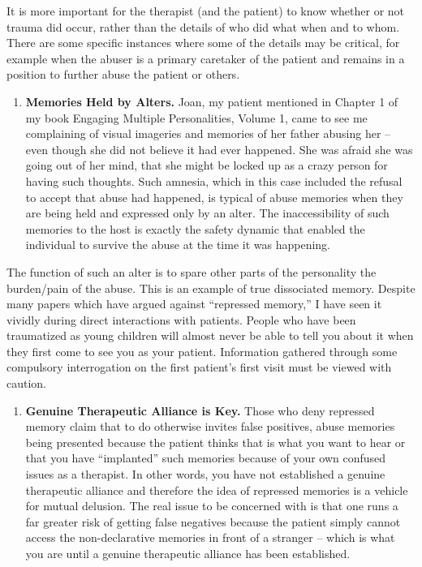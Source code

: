 \documentclass[]{book}
\providecommand{\tightlist}{%
  \setlength{\itemsep}{0pt}\setlength{\parskip}{0pt}}
\begin{document}
It is more important for the therapist (and the patient) to know whether or not trauma did occur, rather than the details of who did what when and to whom. There are some specific instances where some of the details may be critical, for example when the abuser is a primary caretaker of the patient and remains in a position to further abuse the patient or others.

\begin{enumerate}
\def\labelenumi{\arabic{enumi}.}
\setcounter{enumi}{6}
\tightlist
\item
  \textbf{Memories Held by Alters.} Joan, my patient mentioned in Chapter 1 of my book Engaging Multiple Personalities, Volume 1, came to see me complaining of visual imageries and memories of her father abusing her -- even though she did not believe it had ever happened. She was afraid she was going out of her mind, that she might be locked up as a crazy person for having such thoughts. Such amnesia, which in this case included the refusal to accept that abuse had happened, is typical of abuse memories when they are being held and expressed only by an alter. The inaccessibility of such memories to the host is exactly the safety dynamic that enabled the individual to survive the abuse at the time it was happening.
\end{enumerate}

The function of such an alter is to spare other parts of the personality the burden/pain of the abuse. This is an example of true dissociated memory. Despite many papers which have argued against ``repressed memory,'' I have seen it vividly during direct interactions with patients. People who have been traumatized as young children will almost never be able to tell you about it when they first come to see you as your patient. Information gathered through some compulsory interrogation on the first patient's first visit must be viewed with caution.

\begin{enumerate}
\def\labelenumi{\arabic{enumi}.}
\setcounter{enumi}{7}
\tightlist
\item
  \textbf{Genuine Therapeutic Alliance is Key.} Those who deny repressed memory claim that to do otherwise invites false positives, abuse memories being presented because the patient thinks that is what you want to hear or that you have ``implanted'' such memories because of your own confused issues as a therapist. In other words, you have not established a genuine therapeutic alliance and therefore the idea of repressed memories is a vehicle for mutual delusion. The real issue to be concerned with is that one runs a far greater risk of getting false negatives because the patient simply cannot access the non-declarative memories in front of a stranger -- which is what you are until a genuine therapeutic alliance has been established.
\end{enumerate}
\end{document}
